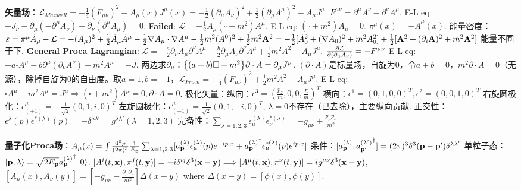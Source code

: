 \documentclass[11pt]{article}
\newcommand{\lag}{\mathcal{L}}
\newcommand{\vbp}{\vb{p}}
\newcommand{\la}{\lambda}
\newcommand{\pa}{\partial}
\begin{document}
{\bf 矢量场}：$\lag_{Maxwell}=-\frac{1}{4}(F_{\mu\nu})^2-A_{\mu}(x)J^{\mu}(x)=-\frac{1}{2}(\pa_{\mu}A_{\nu})^2+\frac{1}{2}(\pa_{\mu}A^{\mu})^2-A_{\mu}J^{\mu}$. $F^{\mu\nu}=\pa^{\mu}A^{\nu}-\pa^{\nu}A^{\mu}$.
E-L eq: $-J_{\nu}-\pa_{\mu}(-\pa^{\mu}A_\nu)-\pa_{\nu}(\pa^{\mu}A_{\mu})=0$.
{\bf Failed}: $\lag=-\frac{1}{2}A_{\mu}(\square+m^2 )A^{\mu}$. E-L eq: $(\square+m^2)A_{\mu}=0$. $\pi^{\mu}(x)=-\dot{A}^{\mu}(x)$. 能量密度：$\varepsilon=\pi^{\mu}\dot{A}_{\mu}-\lag=-(\dot{A}_{\mu})^2+\frac{1}{2}\dot{A}_{\mu}\dot{A}^{\mu}-\frac{1}{2}\nabla A_{\mu}\cdot\nabla A^{\mu}-\frac{1}{2}m^2(A^0)^2+\frac{1}{2}m^2\vb{A}^2=-\frac{1}{2}[\dot{A}_0^2+(\nabla A_0)^2+m^2A_0^2]+\frac{1}{2}[\vb{A}^2+(\pa_i\vb{A})^2+m^2\vb{A}^2]$ 能量不囿于下.
{\bf General Proca Lagrangian}: $\lag=-\frac{a}{2}\pa_{\nu}A_{\mu}\pa^{\nu}A^{\mu}-\frac{b}{2}\pa_{\mu}A_{\nu}\pa^{\nu}A^{\mu}+\frac{1}{2}m^2A^2-A_{\mu}J^{\mu}$.
$\pdv{\lag}{(\pa_{\mu}A_{\nu})}=-F^{\mu\nu}$
E-L eq: $-a\square A^{\mu}-b\pa^{\mu}(\pa_{\nu}A^{\nu})-m^2A^{\mu}=-J$.
两边求$\pa_{\mu}$：$\Bqty{(a+b)\square+m^2}\pa\cdot A=\pa_{\mu}J^{\mu}$. $(\pa\cdot A)$是标量场，自旋为0，令$a+b=0$，$m^2\pa\cdot A=0$（无源），除掉自旋为0的自由度。取$a=1,b=-1$，$\lag_{Proca}=-\frac{1}{4}(F_{\mu\nu})^2+\frac{1}{2}m^2A^2-A_{\mu}J^{\mu}$. E-L eq: $\square A^{\mu}+m^2 A^{\mu}=J^{\mu}\Longrightarrow (\square+m^2)A^{\mu}=0,\pa\cdot A=0$.
极化矢量：纵向：$\epsilon^3=(\frac{p_z}{m},0,0,\frac{E}{m})^T$ 横向：$\epsilon^1=(0,1,0,0)^T,\epsilon^2=(0,0,1,0)^T$ 右旋圆极化：$\epsilon^{\mu}_{(+1)}=-\frac{1}{\sqrt{2}}(0,1,i,0)^T$ 左旋圆极化：$\epsilon^{\mu}_{(-1)}=\frac{1}{\sqrt{2}}(0,1,-i,0)^T$, $\la=0$不存在（已去除），主要纵向贡献.
正交性：$\epsilon^{\la}(p)\epsilon^{*(\la)}(p)=-\delta^{\la\la'}=g^{\la\la'}(\la=1,2,3)$
完备性：$\sum_{\la=1,2,3}\epsilon^{(\la)}_{\mu}\epsilon^{*(\la)}_{\nu}=-g_{\mu\nu}+\frac{p_{\mu}p_{\nu}}{m^2}$

{\bf 量子化Proca场}：$A_{\mu}(x)=\int\frac{\dd^3p}{(2\pi)^3}\frac{1}{E_{\vbp}}\sum_{\la=1,2,3}[a^{(\la)}_{\vbp}\epsilon^{(\la)}_{\mu}(p)e^{-ip\cdot x}+{a^{(\la)}_{\vbp}}^{\dagger}\epsilon^{*(\la)}_{\mu}(p)e^{ip\cdot x}]$ 条件：$[a^{(\la)}_{\vbp},{a^{(\la')}_{\vbp'}}^{\dagger}]=(2\pi)^3\delta^3(\vbp-\vbp')\delta^{\la\la'}$ 单粒子态：$\ket{\vbp,\la}=\sqrt{2E_{\vbp}}{a^{(\la)}_{\vbp}}^{\dagger}\ket{0}$. $[A^i(t,\vb{x}),\pi^j(t,\vb{y})]=-i\delta^{ij}\delta^3(\vb{x-y})\Longrightarrow[A^{\mu}(t,\vb{x}),\pi^{\nu}(t,\vb{y})]=ig^{\mu\nu}\delta^3(\vb{x-y})$, $[A_{\mu}(x),A_{\nu}(y)]=[-g_{\mu\nu}-\frac{\pa_{\mu}\pa_{\nu}}{m^2}]\Delta(x-y)$ where $\Delta(x-y)=[\phi(x),\phi(y)]$.
\end{document}
